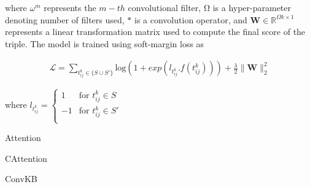 where $\omega^m$ represents the $m-th$ convolutional filter,
$Ω$ is a hyper-parameter denoting number of filters
used, $\ast	$ is a convolution operator, and $\mathbf{W} \in \mathbb{R}^{\Omega k×1}$
represents a linear transformation matrix used to
compute the final score of the triple. The model is
trained using soft-margin loss as

\begin{align}
\mathcal{L} = \sum_{t^k_{ij} \in \{S \cup S'\}} \text{log}(1 + exp(l_{t^k_{ij}} . f(t^k_{ij}))) + \frac{\lambda}{2} \parallel{\mathbf{W}}\parallel_2^2
\end{align}

where $l_{t^k_{ij}} = \begin{cases}
1 &\text{for } t^k_{ij} \in S \\
-1 &\text{for } t^k_{ij} \in S' \\
\end{cases}$

Attention 

CAttention \cite{cordonnier2020multi}

ConvKB \cite{nguyen2017novel}

